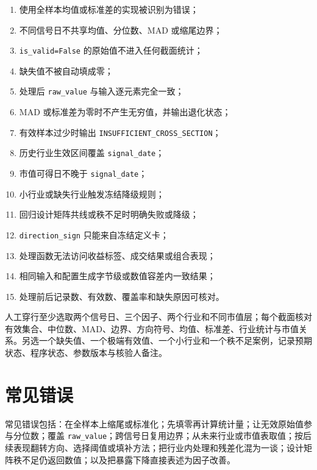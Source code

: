 \begin{enumerate}
  \item 使用全样本均值或标准差的实现被识别为错误；
  \item 不同信号日不共享均值、分位数、MAD 或缩尾边界；
  \item \texttt{is\_valid=False} 的原始值不进入任何截面统计；
  \item 缺失值不被自动填成零；
  \item 处理后 \texttt{raw\_value} 与输入逐元素完全一致；
  \item MAD 或标准差为零时不产生无穷值，并输出退化状态；
  \item 有效样本过少时输出
  \texttt{INSUFFICIENT\_CROSS\_SECTION}；
  \item 历史行业生效区间覆盖 \texttt{signal\_date}；
  \item 市值可得日不晚于 \texttt{signal\_date}；
  \item 小行业或缺失行业触发冻结降级规则；
  \item 回归设计矩阵共线或秩不足时明确失败或降级；
  \item \texttt{direction\_sign} 只能来自冻结定义卡；
  \item 处理函数无法访问收益标签、成交结果或组合表现；
  \item 相同输入和配置生成字节级或数值容差内一致结果；
  \item 处理前后记录数、有效数、覆盖率和缺失原因可核对。
\end{enumerate}

\begin{practicebox}
人工穿行至少选取两个信号日、三个因子、两个行业和不同市值层；每个截面核对有效集合、中位数、MAD、边界、方向符号、均值、标准差、行业统计与市值关系。另选一个缺失值、一个极端有效值、一个小行业和一个秩不足案例，记录预期状态、程序状态、参数版本与核验人备注。
\end{practicebox}

\section{常见错误}

\begin{warningbox}
常见错误包括：在全样本上缩尾或标准化；先填零再计算统计量；让无效原始值参与分位数；覆盖
\texttt{raw\_value}；跨信号日复用边界；从未来行业或市值表取值；按后续表现翻转方向、选择阈值或填补方法；把行业内处理和残差化混为一谈；设计矩阵秩不足仍返回数值；以及把暴露下降直接表述为因子改善。
\end{warningbox}

